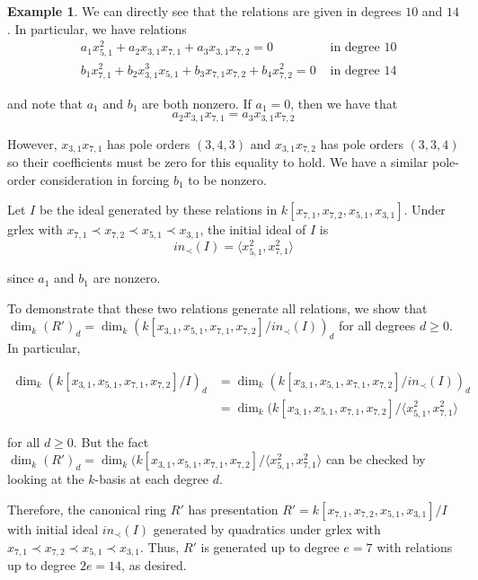 \documentclass{amsart}
\theoremstyle{plain}
\theoremstyle{definition}
\newtheorem{example}[thm]{Example}
\theoremstyle{remark}
\numberwithin{equation}{section}
\begin{document}
\begin{example}
We can directly see that the relations are given in degrees $10$
and $14$. In particular, we have relations
\begin{align*}
	&a_1 x_{5, 1}^2 + a_2 x_{3, 1} x_{7, 1} + a_3 x_{3, 1} x_{7, 2} = 
	0 &\text{ in degree $10$} \\
	&b_1 x_{7, 1}^2 + b_2 x_{3, 1}^3 x_{5, 1} + b_3 x_{7, 1} x_{7, 2} 
	+ b_4 x_{7, 2}^2 = 0  &\text{ in degree $14$}
\end{align*}

\noindent
and note that $a_1$ and $b_1$ are both nonzero. If $a_1 = 0$, then we
have that
\[
	a_2 x_{3, 1} x_{7, 1} = a_3 x_{3, 1} x_{7, 2}
\]

\noindent
However, $x_{3, 1} x_{7, 1}$ has pole orders $(3, 4, 3)$ and
$x_{3, 1} x_{7, 2}$ has pole orders $(3, 3, 4)$ so their
coefficients must be zero for this equality to hold. We have a
similar pole-order consideration in forcing $b_1$ to be nonzero.

Let $I$ be the ideal generated by these relations in
$k[x_{7, 1}, x_{7, 2}, x_{5, 1}, x_{3, 1}]$. Under grlex with
$x_{7,1} \prec x_{7,2} \prec x_{5,1} \prec x_{3,1}$, the initial
ideal of $I$ is
\[
	in_\prec(I) = \langle x_{5, 1}^2, x_{7, 1}^2 \rangle
\]

\noindent
since $a_1$ and $b_1$ are nonzero.

To demonstrate that these two relations generate all 
relations, we show that $\dim_k (R')_d = \dim_k
(k[x_{3, 1}, x_{5, 1}, x_{7, 1}, x_{7, 2}] / in_\prec(I))_d$ for all degrees
$d \geq 0$. In particular, 

\begin{align*}
	\dim_k (k[x_{3, 1}, x_{5, 1}, x_{7, 1}, x_{7, 2}] / I)_d &=
	\dim_k (k[x_{3, 1}, x_{5, 1}, x_{7, 1}, x_{7, 2}]	/ in_\prec(I))_d \\
	&= \dim_k (k[x_{3, 1}, x_{5, 1}, x_{7, 1}, x_{7, 2}] / \langle x_{5, 1}^2,
	x_{7, 1}^2 \rangle
\end{align*}

\noindent
for all $d \geq 0$. But the fact $\dim_k (R')_d = \dim_k (k[x_{3, 1},
x_{5, 1}, x_{7, 1}, x_{7, 2}] / \langle x_{5, 1}^2,	x_{7, 1}^2 \rangle$ can
be checked by looking at the $k$-basis at each degree $d$.

Therefore, the canonical ring $R'$ has presentation $R' =
k[x_{7, 1}, x_{7, 2}, x_{5, 1}, x_{3, 1}] / I$ with
initial ideal $in_\prec(I)$ generated by quadratics under grlex
with $x_{7,1} \prec x_{7,2} \prec x_{5,1} \prec x_{3,1}$.
Thus, $R'$ is generated up to degree $e = 7$ with relations up to
degree $2e = 14$, as desired.

\end{example}
\end{document}
